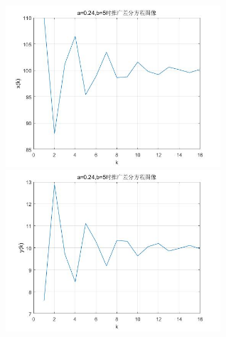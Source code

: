 \documentclass{ctexart}
\begin{document}
\begin{figure}[htbp]
\centering
\begin{minipage}[t]{0.48\textwidth}
\centering
\includegraphics[width=8cm]{x2.jpg}
\end{minipage}
\begin{minipage}[t]{0.48\textwidth}
\centering
\includegraphics[width=8cm]{y2.jpg}
\end{minipage}
\end{figure}
\end{document}
